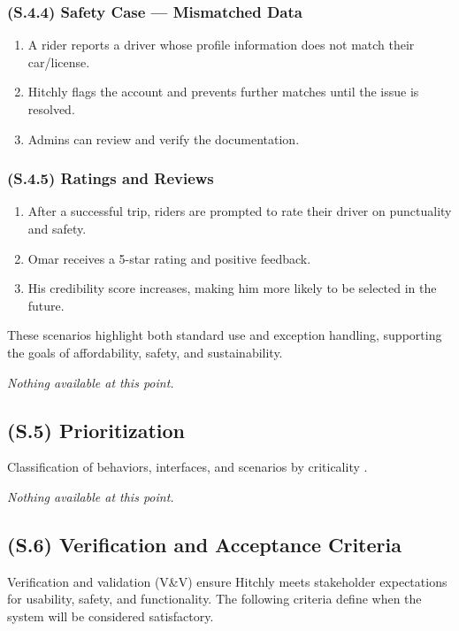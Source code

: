 \documentclass[12pt,letterpaper]{article}
\begin{document}
\subsubsection{(S.4.4) Safety Case — Mismatched Data} %
\begin{enumerate}
    \item A rider reports a driver whose profile information does not match their car/license.
    \item Hitchly flags the account and prevents further matches until the issue is resolved.
    \item Admins can review and verify the documentation.
\end{enumerate}

\subsubsection{(S.4.5) Ratings and Reviews} %
\begin{enumerate}
    \item After a successful trip, riders are prompted to rate their driver on punctuality and safety.
    \item Omar receives a 5-star rating and positive feedback.
    \item His credibility score increases, making him more likely to be selected in the future.
\end{enumerate}

These scenarios highlight both standard use and exception handling, supporting the goals of affordability, safety, and sustainability.

\textit{Nothing available at this point.}

\subsection{(S.5) Prioritization}
Classification of behaviors, interfaces, and scenarios by criticality \cite{meyer2022}.

\textit{Nothing available at this point.}

\subsection{(S.6) Verification and Acceptance Criteria} %

Verification and validation (V\&V) ensure Hitchly meets stakeholder expectations for usability, safety, and functionality. The following criteria define when the system will be considered satisfactory.
\end{document}
